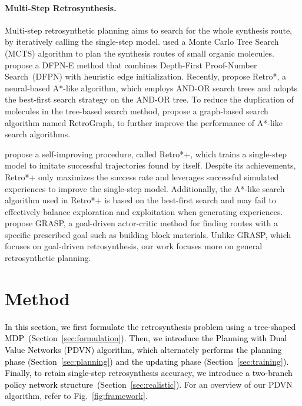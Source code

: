\documentclass[nohyperref]{article}
\theoremstyle{plain}
\theoremstyle{definition}
\theoremstyle{remark}
\begin{document}
\paragraph{Multi-Step Retrosynthesis.}
Multi-step retrosynthetic planning aims to search for the whole synthesis route, by iteratively calling the single-step model. 
\cite{segler2017towards, Segler2018PlanningCS} used a Monte Carlo Tree Search (MCTS) algorithm to plan the synthesis routes of small organic molecules. 
\cite{akihiro2019dfpn} propose a DFPN-E method that combines Depth-First Proof-Number Search~(DFPN) with heuristic edge initialization.   
Recently, \cite{chen20retrostar} propose Retro*, a neural-based A*-like algorithm, which employs AND-OR search trees and adopts the best-first search strategy on the AND-OR tree.
To reduce the duplication of molecules in the tree-based search method, \cite{xie2022retrograph} propose a graph-based search algorithm named RetroGraph, to further improve the performance of A*-like search algorithms. 
 
\cite{kim2021self} propose a self-improving procedure, called Retro*+, which trains a single-step model to imitate successful trajectories found by itself. 
Despite its achievements, Retro*+ only maximizes the success rate and leverages successful simulated experiences to improve the single-step model. 
Additionally, the A*-like search algorithm used in Retro*+ is based on the best-first search and may fail to effectively balance exploration and exploitation when generating experiences. 
\cite{yu2022grasp} propose GRASP, a goal-driven actor-critic method for finding routes with a specific prescribed goal such as building block materials. 
Unlike GRASP, which
focuses on goal-driven retrosynthesis, our work focuses more on general retrosynthetic planning.



\section{Method}




\textcolor{black}{In this section, we first formulate the retrosynthesis problem using a tree-shaped MDP~(Section~\ref{sec:formulation}). Then, 
we introduce the Planning with Dual Value Networks (PDVN) algorithm, which alternately performs the planning phase (Section~\ref{sec:planning})
and the updating phase (Section~\ref{sec:training}). 
Finally, to retain single-step retrosynthesis accuracy, we introduce a two-branch policy network structure~(Section~\ref{sec:realistic}).}
For an overview of our PDVN algorithm, refer to Fig.~\ref{fig:framework}.
\end{document}
